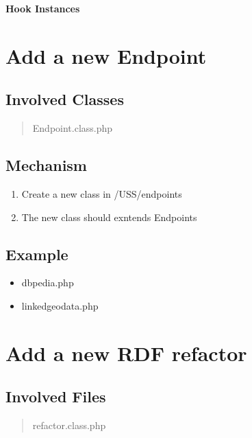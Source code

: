 \documentclass[letterpaper,10pt,english]{sphinxmanual}
\begin{document}
\textbf{Hook Instances}


\section{Add a new Endpoint}
\label{docs/hooks/new_endpoint::doc}\label{docs/hooks/new_endpoint:add-a-new-endpoint}\label{docs/hooks/new_endpoint:hook-new-endpoint}

\subsection{Involved Classes}
\label{docs/hooks/new_endpoint:involved-classes}\begin{quote}

Endpoint.class.php
\end{quote}


\subsection{Mechanism}
\label{docs/hooks/new_endpoint:mechanism}\begin{enumerate}
\item {} 
Create a new class in /USS/endpoints

\item {} 
The new class should exntends Endpoints

\end{enumerate}


\subsection{Example}
\label{docs/hooks/new_endpoint:example}\begin{itemize}
\item {} 
dbpedia.php

\item {} 
linkedgeodata.php

\end{itemize}


\section{Add a new RDF refactor}
\label{docs/hooks/new_refactor:hook-refactor}\label{docs/hooks/new_refactor:add-a-new-rdf-refactor}\label{docs/hooks/new_refactor::doc}

\subsection{Involved Files}
\label{docs/hooks/new_refactor:involved-files}\begin{quote}

refactor.class.php
\end{quote}
\end{document}
